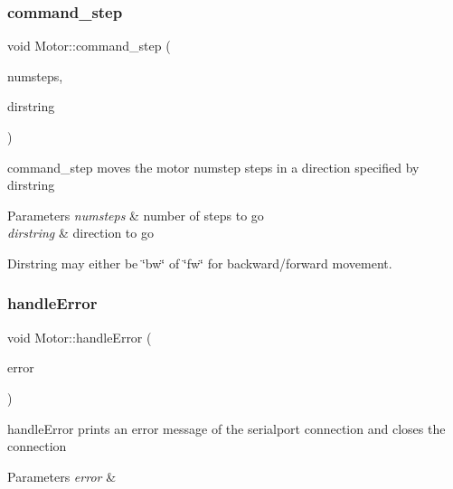 \subsubsection{\texorpdfstring{command\+\_\+step}{command\_step}}
{\footnotesize\ttfamily void Motor\+::command\+\_\+step (\begin{DoxyParamCaption}\item[{uint16\+\_\+t}]{numsteps,  }\item[{Q\+String}]{dirstring }\end{DoxyParamCaption})\hspace{0.3cm}{\ttfamily [slot]}}



command\+\_\+step moves the motor numstep steps in a direction specified by dirstring 


\begin{DoxyParams}{Parameters}
{\em numsteps} & number of steps to go \\
\hline
{\em dirstring} & direction to go\\
\hline
\end{DoxyParams}
Dirstring may either be \char`\"{}bw\char`\"{} of \char`\"{}fw\char`\"{} for backward/forward movement. \mbox{\label{classMotor_a4c95080f6faf87f02844093e948d485a}} 
\subsubsection{\texorpdfstring{handle\+Error}{handleError}}
{\footnotesize\ttfamily void Motor\+::handle\+Error (\begin{DoxyParamCaption}\item[{Q\+Serial\+Port\+::\+Serial\+Port\+Error}]{error }\end{DoxyParamCaption})\hspace{0.3cm}{\ttfamily [slot]}}



handle\+Error prints an error message of the serialport connection and closes the connection 


\begin{DoxyParams}{Parameters}
{\em error} & \\
\hline
\end{DoxyParams}
\mbox{\label{classMotor_a6522462ca0730300ca3335090425786b}} 
